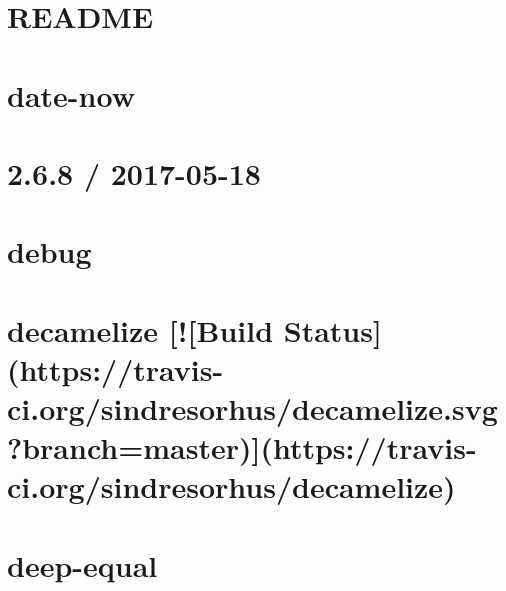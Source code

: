 \documentclass[twoside]{book}
\newcommand{\+}{\discretionary{\mbox{\scriptsize$\hookleftarrow$}}{}{}}
\begin{document}
\chapter{R\+E\+A\+D\+ME}
\label{md__c_1_workspace_demo_src_main_script_node_modules_dashdash__r_e_a_d_m_e}

\chapter{date-\/now}
\label{md__c_1_workspace_demo_src_main_script_node_modules_date-now__r_e_a_d_m_e}

\chapter{2.6.8 / 2017-\/05-\/18}
\label{md__c_1_workspace_demo_src_main_script_node_modules_debug__c_h_a_n_g_e_l_o_g}

\chapter{debug}
\label{md__c_1_workspace_demo_src_main_script_node_modules_debug__r_e_a_d_m_e}

\chapter{decamelize \mbox{[}!\mbox{[}Build Status\mbox{]}(https\+://travis-\/ci.org/sindresorhus/decamelize.svg?branch=master)\mbox{]}(https\+://travis-\/ci.org/sindresorhus/decamelize)}
\label{md__c_1_workspace_demo_src_main_script_node_modules_decamelize_readme}

\chapter{deep-\/equal}
\label{md__c_1_workspace_demo_src_main_script_node_modules_deep-equal_readme}

\end{document}
